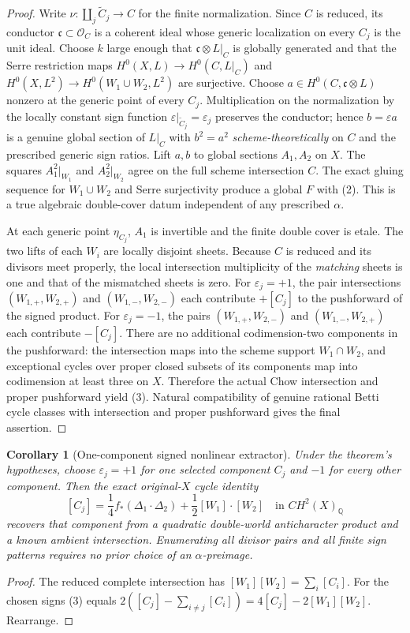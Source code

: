 \documentclass[11pt]{article}
\newtheorem{corollary}{Corollary}
\begin{document}
\begin{proof}
Write $\nu:\coprod_j\widetilde C_j\to C$ for the finite
normalization. Since $C$ is reduced, its conductor
$\mathfrak c\subset\mathcal O_C$ is a coherent ideal whose
generic localization on every $C_j$ is the unit ideal.
Choose $k$ large enough that $\mathfrak c\otimes L|_C$
is globally generated and that the Serre restriction maps
$H^0(X,L)\to H^0(C,L|_C)$ and
$H^0(X,L^2)\to H^0(W_1\cup W_2,L^2)$ are surjective.
Choose $a\in H^0(C,\mathfrak c\otimes L)$ nonzero at the
generic point of every $C_j$. Multiplication on the
normalization by the locally constant sign function
$\varepsilon|_{\widetilde C_j}=\varepsilon_j$ preserves
the conductor; hence $b=\varepsilon a$ is a genuine global
section of $L|_C$ with $b^2=a^2$ \emph{scheme-theoretically}
on $C$ and the prescribed generic sign ratios.
Lift $a,b$ to global sections $A_1,A_2$ on $X$.
The squares $A_1^2|_{W_1}$ and $A_2^2|_{W_2}$ agree on
the full scheme intersection $C$. The exact gluing
sequence for $W_1\cup W_2$ and Serre surjectivity produce
a global $F$ with (2). This is a true algebraic
double-cover datum independent of any prescribed $\alpha$.

At each generic point $\eta_{C_j}$, $A_1$ is invertible
and the finite double cover is etale. The two lifts of
each $W_i$ are locally disjoint sheets. Because $C$ is
reduced and its divisors meet properly, the local
intersection multiplicity of the \emph{matching} sheets
is one and that of the mismatched sheets is zero.
For $\varepsilon_j=+1$, the pair intersections
$(W_{1,+},W_{2,+})$ and $(W_{1,-},W_{2,-})$
each contribute $+[C_j]$ to the pushforward of the
signed product. For $\varepsilon_j=-1$, the pairs
$(W_{1,+},W_{2,-})$ and $(W_{1,-},W_{2,+})$
each contribute $-[C_j]$. There are no additional
codimension-two components in the pushforward: the
intersection maps into the scheme support $W_1\cap W_2$,
and exceptional cycles over proper closed subsets of its
components map into codimension at least three on $X$.
Therefore the actual Chow intersection and proper
pushforward yield (3). Natural compatibility of genuine
rational Betti cycle classes with intersection and proper
pushforward gives the final assertion.
\end{proof}
\begin{corollary}[One-component signed nonlinear extractor]
Under the theorem's hypotheses, choose $\varepsilon_j=+1$
for one selected component $C_j$ and $-1$ for every
other component. Then the exact original-$X$ cycle identity
\[
 \boxed{
 [C_j]=\frac14 f_*(\Delta_1\cdot\Delta_2)
             +\frac12[W_1]\cdot[W_2]
 \quad\text{in } CH^2(X)_{\mathbb Q}
 } \tag{4}
\]
recovers that component from a quadratic double-world
anticharacter product and a known ambient intersection.
Enumerating all divisor pairs and all finite sign patterns
requires no prior choice of an $\alpha$-preimage.
\end{corollary}
\begin{proof}
The reduced complete intersection has
$[W_1][W_2]=\sum_i[C_i]$.
For the chosen signs (3) equals
$2([C_j]-\sum_{i\ne j}[C_i])
=4[C_j]-2[W_1][W_2]$. Rearrange.
\end{proof}
\end{document}
